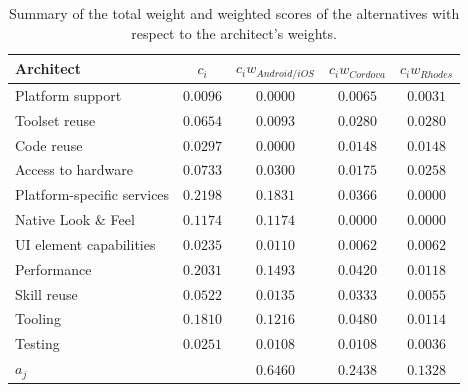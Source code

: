 \begin{table}[h]
    \centering
    \begin{tabular}{lcccc}
        \hline
        \textbf{Architect}         & $c_i$    & $c_i w_{Android/iOS}$ & $c_i w_{Cordova}$  & $c_i w_{Rhodes}$ \\
        \hline
        Platform support           & $0.0096$ & $0.0000$              & $0.0065$           & $0.0031$     \\
        Toolset reuse              & $0.0654$ & $0.0093$              & $0.0280$           & $0.0280$     \\
        Code reuse                 & $0.0297$ & $0.0000$              & $0.0148$           & $0.0148$     \\
        Access to hardware         & $0.0733$ & $0.0300$              & $0.0175$           & $0.0258$     \\
        Platform-specific services & $0.2198$ & $0.1831$              & $0.0366$           & $0.0000$     \\
        Native Look \& Feel        & $0.1174$ & $0.1174$              & $0.0000$           & $0.0000$     \\
        UI element capabilities    & $0.0235$ & $0.0110$              & $0.0062$           & $0.0062$     \\
        Performance                & $0.2031$ & $0.1493$              & $0.0420$           & $0.0118$     \\
        Skill reuse                & $0.0522$ & $0.0135$              & $0.0333$           & $0.0055$     \\
        Tooling                    & $0.1810$ & $0.1216$              & $0.0480$           & $0.0114$     \\
        Testing                    & $0.0251$ & $0.0108$              & $0.0108$           & $0.0036$     \\
        \hline
        $a_j$                      &          & $0.6460$              & $0.2438$           & $0.1328$     \\
        \hline
    \end{tabular}
    \caption{Summary of the total weight and weighted scores of the alternatives with respect to the architect's weights.}
    \label{tab:total:architect}
\end{table}

